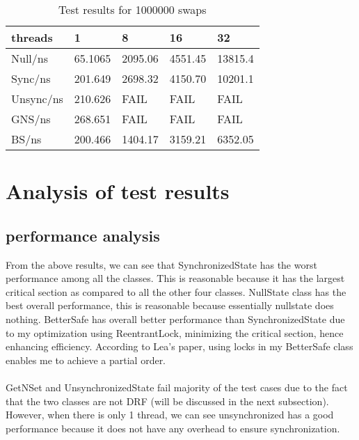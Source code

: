 \documentclass[letterpaper,twocolumn,10pt]{article}
\begin{document}
\begin{table}[]
\begin{tabular}{|l|l|l|l|l|}
\hline
threads   & 1       & 8       & 16      & 32      \\ \hline
Null/ns   & 65.1065 & 2095.06 & 4551.45 & 13815.4 \\ \hline
Sync/ns   & 201.649 & 2698.32 & 4150.70 & 10201.1 \\ \hline
Unsync/ns & 210.626 & FAIL    & FAIL    & FAIL    \\ \hline
GNS/ns    & 268.651 & FAIL    & FAIL    & FAIL    \\ \hline
BS/ns     & 200.466 & 1404.17 & 3159.21 & 6352.05 \\ \hline
\end{tabular}
\caption{Test results for 1000000 swaps}
\end{table}

\section{Analysis of test results}
\subsection{performance analysis}
From the above results, we can see that SynchronizedState has the worst performance among all the classes. This is reasonable because it has the largest critical section as compared to all the other four classes. NullState class has the best overall performance, this is reasonable because essentially nullstate does nothing. BetterSafe has overall better performance than SynchronizedState due to my optimization using ReentrantLock, minimizing the critical section, hence enhancing efficiency. According to Lea's paper, using locks in my BetterSafe class enables me to achieve a partial order.\\~\\
GetNSet and UnsynchronizedState fail majority of the test cases due to the fact that the two classes are not DRF (will be discussed in the next subsection). However, when there is only 1 thread, we can see unsynchronized has a good performance because it does not have any overhead to ensure synchronization.
\end{document}
